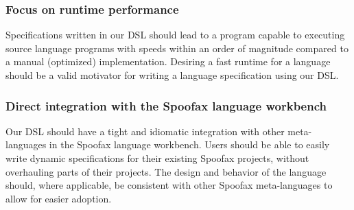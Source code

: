 \subsubsection*{Focus on runtime performance}
Specifications written in our \ac{DSL} should lead to a program capable to executing source language programs with speeds within an order of magnitude compared to a manual (optimized) implementation. Desiring a fast runtime for a language should be a valid motivator for writing a language specification using our \ac{DSL}.

\subsubsection*{Direct integration with the Spoofax language workbench}
Our \ac{DSL} should have a tight and idiomatic integration with other meta-languages in the Spoofax language workbench. Users should be able to easily write dynamic specifications for their existing Spoofax projects, without overhauling parts of their projects. The design and behavior of the language should, where applicable, be consistent with other Spoofax meta-languages to allow for easier adoption.
